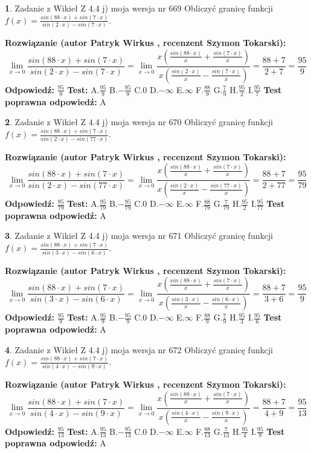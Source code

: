 \documentclass[12pt, a4paper]{article}
\theoremstyle{definition} %
\newtheorem{zad}{}
\newcommand{\zadStart}[1]{\begin{zad}#1\newline}
\newcommand{\zadStop}{\end{zad}}
\newcommand{\rozwStart}[2]{\noindent \textbf{Rozwiązanie (autor #1 , recenzent #2): }\newline}
\newcommand{\rozwStop}{\newline}
\newcommand{\odpStart}{\noindent \textbf{Odpowiedź:}\newline}
\newcommand{\odpStop}{\newline}
\newcommand{\testStart}{\noindent \textbf{Test:}\newline}
\newcommand{\testStop}{\newline}
\newcommand{\kluczStart}{\noindent \textbf{Test poprawna odpowiedź:}\newline}
\newcommand{\kluczStop}{\newline}
\begin{document}
\zadStart{Zadanie z Wikieł Z 4.4 j) moja wersja nr 669}
Obliczyć granicę funkcji $f(x)=\frac{sin(88\cdot x) +sin(7\cdot x)}{sin(2\cdot x) -sin(7\cdot x)}$.
\zadStop
\rozwStart{Patryk Wirkus}{Szymon Tokarski}
$$\lim\limits_{x\to 0}\frac{sin(88\cdot x) +sin(7\cdot x)}{sin(2\cdot x) -sin(7\cdot x)}=\lim\limits_{x\to 0}\frac{x(\frac{sin(88\cdot x)}{x}+\frac{sin(7\cdot x)}{x})}{x(\frac{sin(2\cdot x)}{x}-\frac{sin(7\cdot x)}{x})}=\frac{88+7}{2+7} = \frac{95}{9}$$
\rozwStop
\odpStart
$\frac{95}{9}$
\odpStop
\testStart
A.$\frac{95}{9}$
B.$-\frac{95}{9}$
C.$0$
D.$-\infty$
E.$\infty$
F.$\frac{88}{9}$
G.$\frac{7}{9}$
H.$\frac{95}{2}$
I.$\frac{95}{7}$
\testStop
\kluczStart
A
\kluczStop



\zadStart{Zadanie z Wikieł Z 4.4 j) moja wersja nr 670}
Obliczyć granicę funkcji $f(x)=\frac{sin(88\cdot x) +sin(7\cdot x)}{sin(2\cdot x) -sin(77\cdot x)}$.
\zadStop
\rozwStart{Patryk Wirkus}{Szymon Tokarski}
$$\lim\limits_{x\to 0}\frac{sin(88\cdot x) +sin(7\cdot x)}{sin(2\cdot x) -sin(77\cdot x)}=\lim\limits_{x\to 0}\frac{x(\frac{sin(88\cdot x)}{x}+\frac{sin(7\cdot x)}{x})}{x(\frac{sin(2\cdot x)}{x}-\frac{sin(77\cdot x)}{x})}=\frac{88+7}{2+77} = \frac{95}{79}$$
\rozwStop
\odpStart
$\frac{95}{79}$
\odpStop
\testStart
A.$\frac{95}{79}$
B.$-\frac{95}{79}$
C.$0$
D.$-\infty$
E.$\infty$
F.$\frac{88}{79}$
G.$\frac{7}{79}$
H.$\frac{95}{2}$
I.$\frac{95}{77}$
\testStop
\kluczStart
A
\kluczStop



\zadStart{Zadanie z Wikieł Z 4.4 j) moja wersja nr 671}
Obliczyć granicę funkcji $f(x)=\frac{sin(88\cdot x) +sin(7\cdot x)}{sin(3\cdot x) -sin(6\cdot x)}$.
\zadStop
\rozwStart{Patryk Wirkus}{Szymon Tokarski}
$$\lim\limits_{x\to 0}\frac{sin(88\cdot x) +sin(7\cdot x)}{sin(3\cdot x) -sin(6\cdot x)}=\lim\limits_{x\to 0}\frac{x(\frac{sin(88\cdot x)}{x}+\frac{sin(7\cdot x)}{x})}{x(\frac{sin(3\cdot x)}{x}-\frac{sin(6\cdot x)}{x})}=\frac{88+7}{3+6} = \frac{95}{9}$$
\rozwStop
\odpStart
$\frac{95}{9}$
\odpStop
\testStart
A.$\frac{95}{9}$
B.$-\frac{95}{9}$
C.$0$
D.$-\infty$
E.$\infty$
F.$\frac{88}{9}$
G.$\frac{7}{9}$
H.$\frac{95}{3}$
I.$\frac{95}{6}$
\testStop
\kluczStart
A
\kluczStop



\zadStart{Zadanie z Wikieł Z 4.4 j) moja wersja nr 672}
Obliczyć granicę funkcji $f(x)=\frac{sin(88\cdot x) +sin(7\cdot x)}{sin(4\cdot x) -sin(9\cdot x)}$.
\zadStop
\rozwStart{Patryk Wirkus}{Szymon Tokarski}
$$\lim\limits_{x\to 0}\frac{sin(88\cdot x) +sin(7\cdot x)}{sin(4\cdot x) -sin(9\cdot x)}=\lim\limits_{x\to 0}\frac{x(\frac{sin(88\cdot x)}{x}+\frac{sin(7\cdot x)}{x})}{x(\frac{sin(4\cdot x)}{x}-\frac{sin(9\cdot x)}{x})}=\frac{88+7}{4+9} = \frac{95}{13}$$
\rozwStop
\odpStart
$\frac{95}{13}$
\odpStop
\testStart
A.$\frac{95}{13}$
B.$-\frac{95}{13}$
C.$0$
D.$-\infty$
E.$\infty$
F.$\frac{88}{13}$
G.$\frac{7}{13}$
H.$\frac{95}{4}$
I.$\frac{95}{9}$
\testStop
\kluczStart
A
\kluczStop
\end{document}
